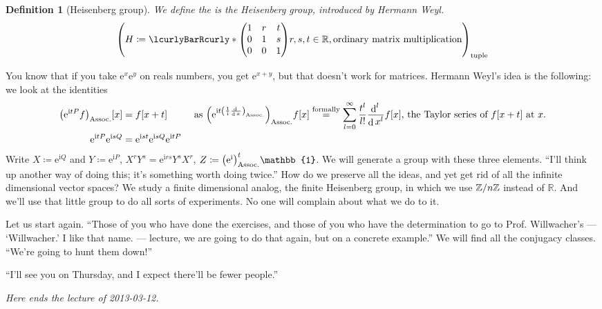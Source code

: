 \documentclass[10pt]{article}
\newtheorem*{definition}{Definition}
\DeclarePairedDelimiter\parentheses{\lparen}{\rparen}
\DeclarePairedDelimiter\squareBrackets{[}{]}
\newcommand\I{\mathrm{i}}
\newcommand\E{\mathrm{e}}
\DeclareMathOperator{\diffd}{d}
\newcommand\deriv[3][]{\frac{\diffd^{#1} {#3}}{{\diffd {#2}}^{#1}}}
\newcommand{\derivop}[2][]{\deriv[#1]{#2}{}}
\newcommand{\Z}[1][]{\ifstrempty{#1}{\mathbb{Z}}{\mathbb{Z}/{#1}\mathbb{Z}}}
\newcommand{\R}{\mathbb{R}}
\newcommand\of[1]{\parentheses*{#1}}
\newcommand\pa[1]{\parentheses*{#1}}
\newcommand\tuple[1]{\parentheses*{#1}}
\newcommand{\setst}[2]{\lcurlyBarRcurly*{{\textstyle #1}}{{\textstyle #2}}}
\newcommand{\Identity}{\mathbb{1}}
\renewcommand\pa[1]{\parentheses*{#1}_\mathrm{Assoc.}}
\renewcommand\of[1]{\squareBrackets*{#1}}
\renewcommand\tuple[1]{\parentheses*{#1}_{\mathrm{tuple}}}
\newcommand{\lectureEnd}[1]{

\emph{Here ends the lecture of #1.}

}
\begin{document}
\begin{definition}[Heisenberg group]
We define the is the Heisenberg group, introduced by Hermann Weyl.
\begin{equation*}
\tuple{
H \coloneqq \setst{
\begin{pmatrix}
1 & r & t\\
0 & 1 & s\\
0 & 0 & 1\\
\end{pmatrix}
}{r,s,t\in\R}, 
\text{ordinary matrix multiplication}}
\end{equation*}
\end{definition}

You know that if you take $\E^x\E^y$ on reals numbers, you get $\E^{x+y}$, but that doesn't work for matrices. Hermann Weyl's idea is the following: we look at the identities \begin{align*}
\pa{\E^{\I t P} f}\of x &= f\of{x+t}
&&\text{ as }\pa{\E^{\I t \pa{\frac{1}{\I}\derivop x}}}f\of x \overset{\text{formally}}{=} \sum{l=0}[\infty]\frac{t^l}{l!}\derivop[l] x f \of x \text{, the Taylor series of $f\of{x + t}$ at $x$.}\\
\E^{\I t P}\E^{\I s Q} &= \E^{\I s t} \E^{\I s Q} \E^{\I t P}
\end{align*}
Write $X \coloneqq \E^{\I Q}$ and $Y \coloneqq \E^{\I P}$, $X^r Y^s = \E^{\I r s} Y^s X^r$, $Z \coloneqq \pa{\E^\I}^t \Identity$. We will generate a group with these three elements. ``I'll think up another way of doing this; it's something worth doing twice.'' How do we preserve all the ideas, and yet get rid of all the infinite dimensional vector spaces? We study a finite dimensional analog, the finite Heisenberg group, in which we use $\Z[n]$ instead of $\R$. And we'll use that little group to do all sorts of experiments. No one will complain about what we do to it. 

Let us start again. ``Those of you who have done the exercises, and those of you who have the determination to go to Prof. Willwacher's --- `Willwacher.' I like that name. --- lecture, we are going to do that again, but on a concrete example.''
We will find all the conjugacy classes. ``We're going to hunt them down!'' 

``I'll see you on Thursday, and I expect there'll be fewer people.''
\lectureEnd{2013-03-12}
\end{document}
